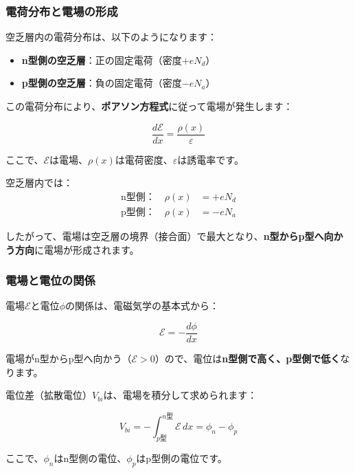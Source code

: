\subsubsection{電荷分布と電場の形成}

空乏層内の電荷分布は、以下のようになります：

\begin{itemize}
\item \textbf{n型側の空乏層}：正の固定電荷（密度$+eN_d$）
\item \textbf{p型側の空乏層}：負の固定電荷（密度$-eN_a$）
\end{itemize}

この電荷分布により、\textbf{ポアソン方程式}に従って電場が発生します：

\begin{equation}
\frac{d\mathcal{E}}{dx} = \frac{\rho(x)}{\varepsilon}
\end{equation}

ここで、$\mathcal{E}$は電場、$\rho(x)$は電荷密度、$\varepsilon$は誘電率です。

空乏層内では：
\begin{align}
\text{n型側：} \quad \rho(x) &= +eN_d \\
\text{p型側：} \quad \rho(x) &= -eN_a
\end{align}

したがって、電場は空乏層の境界（接合面）で最大となり、\textbf{n型からp型へ向かう方向}に電場が形成されます。

\subsubsection{電場と電位の関係}

電場$\mathcal{E}$と電位$\phi$の関係は、電磁気学の基本式から：

\begin{equation}
\mathcal{E} = -\frac{d\phi}{dx}
\end{equation}

電場がn型からp型へ向かう（$\mathcal{E} > 0$）ので、電位は\textbf{n型側で高く、p型側で低く}なります。

電位差（拡散電位）$V_{bi}$は、電場を積分して求められます：

\begin{equation}
V_{bi} = -\int_{p\text{型}}^{n\text{型}} \mathcal{E}\, dx = \phi_{n} - \phi_{p}
\end{equation}

ここで、$\phi_n$はn型側の電位、$\phi_p$はp型側の電位です。

